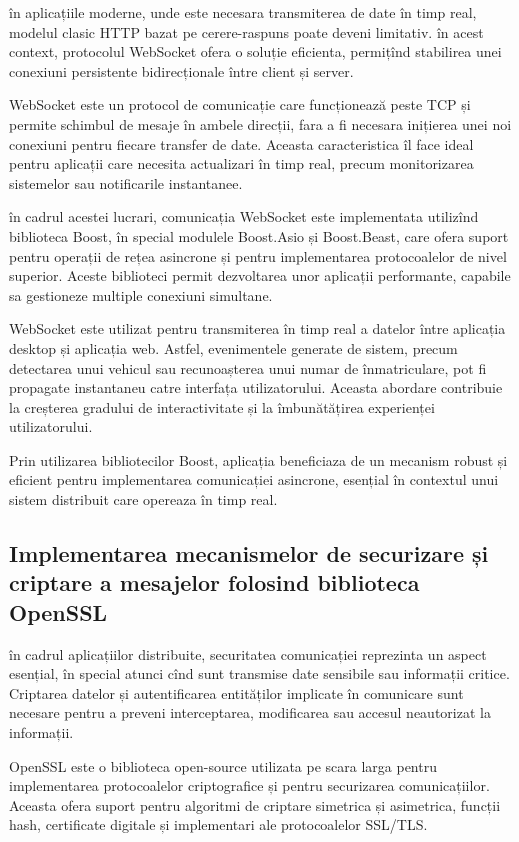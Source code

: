 în aplicațiile moderne, unde este necesara transmiterea de date în timp real, modelul clasic HTTP bazat pe cerere-raspuns poate deveni limitativ. în acest context, protocolul WebSocket ofera o soluție eficienta, permițînd stabilirea unei conexiuni persistente bidirecționale între client și server.

WebSocket este un protocol de comunicație care funcționează peste TCP și permite schimbul de mesaje în ambele direcții, fara a fi necesara inițierea unei noi conexiuni pentru fiecare transfer de date. Aceasta caracteristica îl face ideal pentru aplicații care necesita actualizari în timp real, precum monitorizarea sistemelor sau notificarile instantanee.

în cadrul acestei lucrari, comunicația WebSocket este implementata utilizînd biblioteca Boost, în special modulele Boost.Asio și Boost.Beast, care ofera suport pentru operații de rețea asincrone și pentru implementarea protocoalelor de nivel superior. Aceste biblioteci permit dezvoltarea unor aplicații performante, capabile sa gestioneze multiple conexiuni simultane.

WebSocket este utilizat pentru transmiterea în timp real a datelor între aplicația desktop și aplicația web. Astfel, evenimentele generate de sistem, precum detectarea unui vehicul sau recunoașterea unui numar de înmatriculare, pot fi propagate instantaneu catre interfața utilizatorului. Aceasta abordare contribuie la creșterea gradului de interactivitate și la îmbunătățirea experienței utilizatorului.

Prin utilizarea bibliotecilor Boost, aplicația beneficiaza de un mecanism robust și eficient pentru implementarea comunicației asincrone, esențial în contextul unui sistem distribuit care opereaza în timp real.

\subsection*{Implementarea mecanismelor de securizare și criptare a mesajelor folosind biblioteca OpenSSL}

în cadrul aplicațiilor distribuite, securitatea comunicației reprezinta un aspect esențial, în special atunci cînd sunt transmise date sensibile sau informații critice. Criptarea datelor și autentificarea entităților implicate în comunicare sunt necesare pentru a preveni interceptarea, modificarea sau accesul neautorizat la informații.

OpenSSL este o biblioteca open-source utilizata pe scara larga pentru implementarea protocoalelor criptografice și pentru securizarea comunicațiilor. Aceasta ofera suport pentru algoritmi de criptare simetrica și asimetrica, funcții hash, certificate digitale și implementari ale protocoalelor SSL/TLS.

